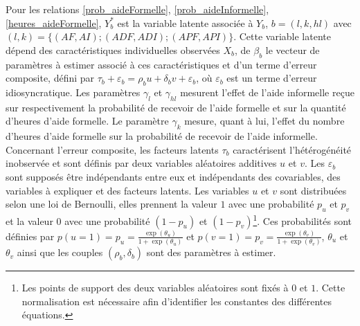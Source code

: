 \begin{Article}
\begin{refsection}[Bonnal]
\noindent Pour les relations \eqref{prob_aideFormelle}, \eqref{prob_aideInformelle}, \eqref{heures_aideFormelle}, $Y_{b}^*$ est la variable latente associée à $Y_{b}$, $b=(l,k,hl)$ avec  $(l,k)=\{(AF,AI);(ADF,ADI);(APF,API)\}$. Cette variable latente dépend des caractéristiques individuelles observées $X_{b}$, de $\beta_{b}$ le vecteur de paramètres à estimer associé à ces caractéristiques et d'un terme d'erreur composite, défini par $\tau_b + \varepsilon_b=\rho_bu + \delta_bv + \varepsilon_b$, où $\varepsilon_b$ est un terme d'erreur idiosyncratique. Les paramètres $\gamma_{l}$ et $\gamma_{hl}$ mesurent l'effet de l'aide informelle reçue sur respectivement la probabilité de recevoir de l'aide formelle et sur la quantité d'heures d'aide formelle. Le paramètre $\gamma_{k}$ mesure, quant à lui, l'effet du nombre d'heures d'aide formelle sur la probabilité de recevoir de l'aide informelle. Concernant l’erreur composite, les facteurs latents $\tau_b$ caractérisent l’hétérogénéité inobservée et sont définis par deux variables aléatoires additives $u$ et $v$. Les $\varepsilon_b$ sont supposés être indépendants entre eux et indépendants des covariables, des variables à expliquer et des facteurs latents. Les variables $u$ et $v$ sont distribuées selon une loi de Bernoulli, elles prennent la valeur $1$ avec une probabilité $p_u$ et $p_v$ et la valeur $0$ avec une probabilité $(1-p_u)$ et $(1-p_v)$\footnote{Les points de support des deux variables aléatoires sont fixés à $0$ et $1$. Cette normalisation est nécessaire afin d'identifier les constantes des différentes équations.}. Ces probabilités sont définies par $p(u=1)=p_u=\frac{\exp{(\theta_u)}}{1+\exp{(\theta_u)}}$ et $p(v=1)=p_v=\frac{\exp{(\theta_v)}}{1+\exp{(\theta_v)}}$, $\theta_u$ et $\theta_v$ ainsi que les couples $(\rho_b,\delta_b)$ sont des paramètres à estimer.



\end{refsection}
\end{Article}
